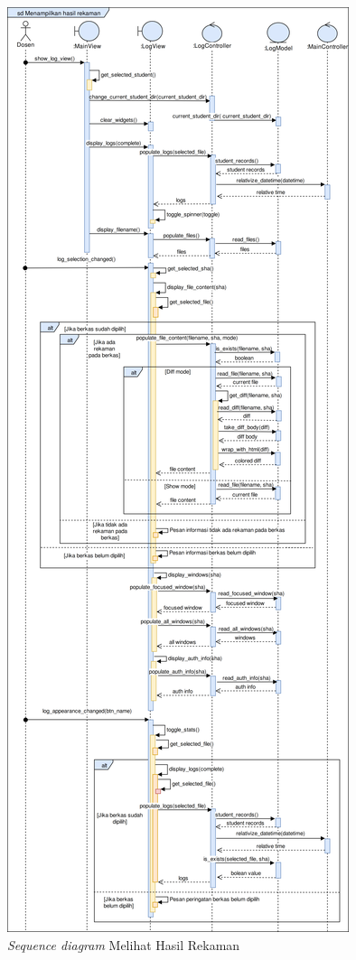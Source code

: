 \begin{figure}[tph]
  \centering
  \includegraphics[width=.6\linewidth]{img/use-case/sd/sd-view-record-result-v1}
  \caption{\emph{Sequence diagram} Melihat Hasil Rekaman}\label{fig:sd-view-record-result}
\end{figure}


